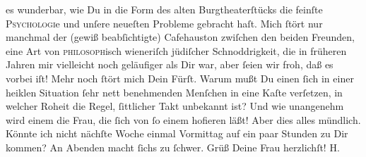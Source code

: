 \begin{ledgroupsized}[t]{13cm}
               es wunderbar, wie Du in die Form des alten Burgtheaterſtücks die feinſte \textsc{Psychologi}e und
               unſere neueſten Probleme gebracht haſt. Mich ſtört nur manchmal der (gewiß
               beabſichtigte) Cafehauston zwiſchen den beiden Freunden, eine Art von \textsc{philosoph}isch wieneriſch
               jüdiſcher Schnoddrigkeit, die in früheren Jahren mir vielleicht noch geläufiger als
               Dir war, aber ſeien wir froh, daß es vorbei iſt! Mehr noch ſtört mich Dein Fürſt. Warum mußt Du einen ſich
               in einer heiklen Situation ſehr nett benehmenden Menſchen in eine Kaſte verſetzen, in
               welcher Roheit die Regel, ſittlicher Takt unbekannt ist? Und wie unangenehm wird
               einem die Frau, die ſich von ſo einem hofieren läßt! Aber dies alles mündlich. Könnte
               ich nicht nächſte Woche einmal Vormittag auf ein paar Stunden zu Dir kommen? An
               Abenden macht ſichs zu ſchwer. Grüß Deine Frau herzlichſt! \spacefill\mbox{H.}\pend
           
         
         \endnumbering{}\end{ledgroupsized}  \newcommand{\dateiname}{L01550}\newcommand{\titel}{Hermann Bahr an Arthur Schnitzler, 20. 9. 1905}\newcommand{\editorInnen}{ Kurt Ifkovits,  Martin Anton Müller}
      